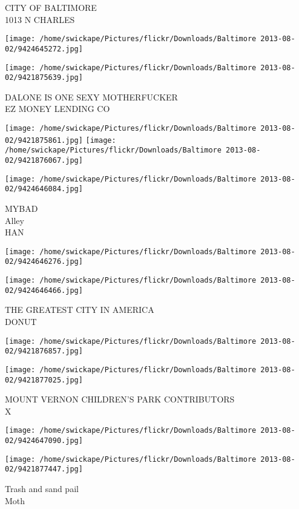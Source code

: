 \documentclass[10pt,letterpaper]{article}
\begin{document}
CITY OF BALTIMORE\\
1013 N CHARLES
\pagebreak

\texttt{[image: /home/swickape/Pictures/flickr/Downloads/Baltimore 2013-08-02/9424645272.jpg]}

\vspace{0.25in}
\texttt{[image: /home/swickape/Pictures/flickr/Downloads/Baltimore 2013-08-02/9421875639.jpg]}

DALONE IS ONE SEXY MOTHERFUCKER\\
EZ MONEY LENDING CO
\pagebreak

\texttt{[image: /home/swickape/Pictures/flickr/Downloads/Baltimore 2013-08-02/9421875861.jpg]}
\texttt{[image: /home/swickape/Pictures/flickr/Downloads/Baltimore 2013-08-02/9421876067.jpg]}

\texttt{[image: /home/swickape/Pictures/flickr/Downloads/Baltimore 2013-08-02/9424646084.jpg]}

MYBAD\\
Alley\\
HAN
\pagebreak

\texttt{[image: /home/swickape/Pictures/flickr/Downloads/Baltimore 2013-08-02/9424646276.jpg]}

\vspace{0.25in}
\texttt{[image: /home/swickape/Pictures/flickr/Downloads/Baltimore 2013-08-02/9424646466.jpg]}

THE GREATEST CITY IN AMERICA\\
DONUT
\pagebreak

\texttt{[image: /home/swickape/Pictures/flickr/Downloads/Baltimore 2013-08-02/9421876857.jpg]}

\vspace{0.25in}
\texttt{[image: /home/swickape/Pictures/flickr/Downloads/Baltimore 2013-08-02/9421877025.jpg]}

MOUNT VERNON CHILDREN'S PARK CONTRIBUTORS\\
X
\pagebreak

\texttt{[image: /home/swickape/Pictures/flickr/Downloads/Baltimore 2013-08-02/9424647090.jpg]}

\vspace{0.25in}
\texttt{[image: /home/swickape/Pictures/flickr/Downloads/Baltimore 2013-08-02/9421877447.jpg]}

Trash and sand pail\\
Moth
\pagebreak
\end{document}
